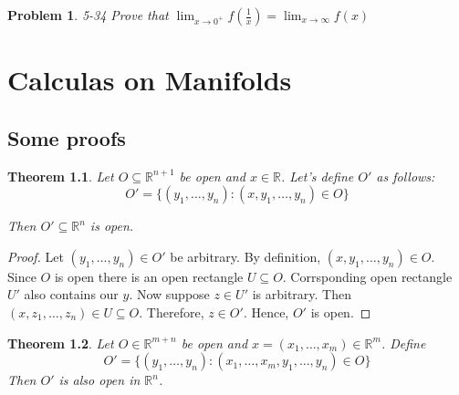 \documentclass[12pt]{book}
\newcommand\T{\rule{0pt}{2.6ex}}
\newcommand\B{\rule[-1.2ex]{0pt}{0pt}}
\newtheorem{theorem}{Theorem}
\newtheorem*{problem*}{Problem}
\begin{document}
\begin{problem*}
  \T\B 5-34 Prove that $\lim_{x \to 0^+}f(\frac{1}{x}) = \lim_{x \to \infty} f(x)$
\end{problem*}

\chapter{Calculas on Manifolds}
\section{Some proofs}
% 

\begin{theorem}
  Let $O \subseteq \mathbb{R}^{n+1}$ be open and $x\in \mathbb{R}$. Let's define $O'$ as follows:
  \[
  O' = \{(y_1, \ldots, y_n) : (x,y_1, \ldots, y_n) \in O \}
  \]

  Then $O' \subseteq \mathbb{R}^n$ is open. 
\end{theorem}

\begin{proof}
  Let $(y_1, \ldots, y_n) \in O'$ be arbitrary. By definition, $(x, y_1, \ldots, y_n) \in O$. Since $O$ is open there is an open rectangle $U \subseteq O$. Corrsponding open rectangle $U'$ also contains our $y$. Now suppose $z \in U'$ is arbitrary. Then $(x, z_1, \ldots, z_n) \in U \subseteq O$. Therefore, $z \in O'$. Hence, $O'$ is open. 
\end{proof}


\begin{theorem}
  Let $O \in \mathbb{R}^{m+n}$ be open and $x = (x_1, \ldots, x_m) \in \mathbb{R}^m$. Define
  \[
  O' = \{(y_1, \ldots, y_n) : (x_1, \ldots, x_m, y_1, \ldots, y_n) \in O \}
  \]
  Then $O'$ is also open in $\mathbb{R}^n$. 
\end{theorem}
\end{document}
